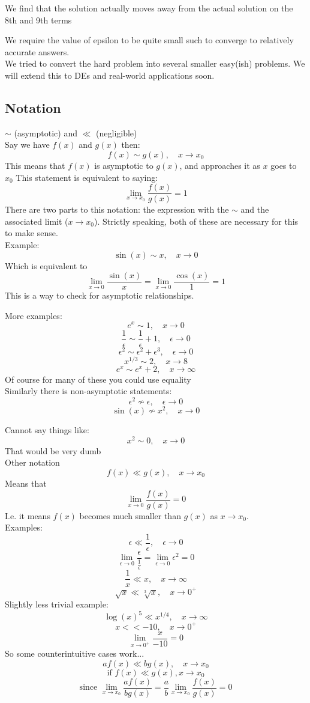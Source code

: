 \documentclass{/home/janmebows/Documents/LatexTemplates/myassignment}
\begin{document}
We find that the solution actually moves away from the actual solution on the 8th and 9th terms

We require the value of epsilon to be quite small such to converge to relatively accurate answers.\\

We tried to convert the hard problem into several smaller easy(ish) problems. We will extend this to DEs and real-world applications soon.

\subsection{Notation}
$\sim$ (asymptotic) and $\ll$ (negligible)\\
Say we have $f(x)$ and $g(x)$ then:
\[f(x) \sim g(x), \quad x\to x_0\]
This means that $f(x)$ is asymptotic to $g(x)$, and approaches it as $x$ goes to $x_0$
This statement is equivalent to saying:
\[\lim_{x\to x_0} \frac{f(x)}{g(x)} = 1\]
There are two parts to this notation: the expression with the $\sim$ and the associated limit ($x\to x_0$). Strictly speaking, both of these are necessary for this to make sense.\\

Example:
\[\sin(x) \sim x, \quad x\to 0\]
Which is equivalent to
\[\lim_{x\to 0} \frac{\sin(x)}{x} = \lim_{x\to 0} \frac{\cos(x)}{1} = 1\]
This is a way to check for asymptotic relationships.

More examples: 
\[e^x \sim 1, \quad x\to0\]
\[\frac1{\epsilon} \sim \frac1\epsilon + 1, \quad \epsilon\to 0\]
\[\epsilon^2 \sim \epsilon^2 + \epsilon^3, \quad \epsilon\to 0\]
\[x^{1/3} \sim 2, \quad x \to 8\]
\[e^x \sim e^x + 2, \quad x\to\infty\]
Of course for many of these you could use equality\\
Similarly there is non-asymptotic statements:
\[\epsilon^2 \not\sim \epsilon, \quad \epsilon\to 0\]
\[\sin(x) \not\sim x^2, \quad x\to 0\]

Cannot say things like:
\[x^2 \sim 0, \quad x\to 0\]
That would be very dumb\\
Other notation
\[f(x) \ll g(x), \quad x\to x_0\]
Means that
\[\lim_{x\to 0} \frac{f(x)}{g(x)} = 0\]
I.e. it means $f(x)$ becomes much smaller than $g(x)$ as $x\to x_0$.\\
Examples:
\[\epsilon\ll \frac1\epsilon, \quad \epsilon\to 0\]
\[\lim_{\epsilon\to 0} \frac{\epsilon}{\frac{1}{\epsilon}} = \lim_{\epsilon\to 0} \epsilon^2 = 0\]
\[\frac1x \ll x, \quad x\to \infty\]
\[\sqrt{x} \ll \sqrt[3]{x},\quad x\to 0^+\]
Slightly less trivial example:
\[\log(x)^5 \ll x^{1/4}, \quad x\to\infty\]
\[x << -10, \quad x\to 0^+\]
\[\lim_{x\to0^+}\frac{x}{-10} = 0\]
So some counterintuitive cases work...
\[af(x) \ll bg(x), \quad x\to x_0\]
\[\text{if }f(x)\ll g(x), x\to x_0\]
\[\text{since }\lim_{x\to x_0}\frac{af(x)}{bg(x)} = \frac{a}{b} \lim_{x\to x_0} \frac{f(x)}{g(x)} = 0 \]
\end{document}
